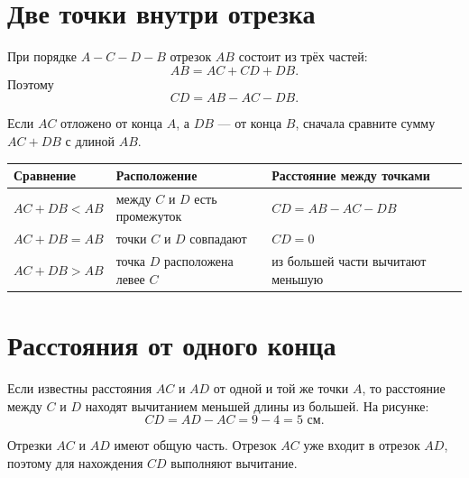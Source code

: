 \section{Две точки внутри отрезка}

\fourpointsfigure

При порядке \(A-C-D-B\) отрезок \(AB\) состоит из трёх частей:
\[
  AB=AC+CD+DB.
\]
Поэтому
\[
  CD=AB-AC-DB.
\]

\oppositeendsfigure

\begin{propertybox}
  Если \(AC\) отложено от конца \(A\), а \(DB\) --- от конца \(B\), сначала
  сравните сумму \(AC+DB\) с длиной \(AB\).
\end{propertybox}

\threeoppositecasesfigure

\begin{center}
  \renewcommand{\arraystretch}{1.38}
  \begin{tabularx}{\textwidth}{
    >{\raggedright\arraybackslash}p{}
    >{\raggedright\arraybackslash}p{}
    >{\raggedright\arraybackslash}X}
    \toprule
    \rowcolor{TableHeader}
    Сравнение & Расположение & Расстояние между точками \\
    \midrule
    \(AC+DB<AB\)
      & между \(C\) и \(D\) есть промежуток
      & \(CD=AB-AC-DB\) \\
    \addlinespace[0.2em]
    \(AC+DB=AB\)
      & точки \(C\) и \(D\) совпадают
      & \(CD=0\) \\
    \addlinespace[0.2em]
    \(AC+DB>AB\)
      & точка \(D\) расположена левее \(C\)
      & из большей части вычитают меньшую \\
    \bottomrule
  \end{tabularx}
\end{center}

\section{Расстояния от одного конца}

\sameendpointfigure

Если известны расстояния \(AC\) и \(AD\) от одной и той же точки \(A\),
то расстояние между \(C\) и \(D\) находят вычитанием меньшей длины из
большей. На рисунке:
\[
  CD=AD-AC=9-4=5\text{ см}.
\]

\begin{warningbox}
  Отрезки \(AC\) и \(AD\) имеют общую часть. Отрезок \(AC\) уже входит в
  отрезок \(AD\), поэтому для нахождения \(CD\) выполняют вычитание.
\end{warningbox}

